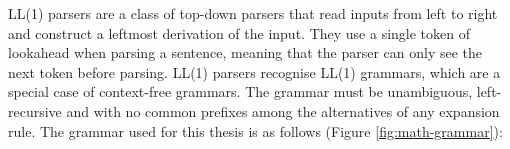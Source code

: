 LL(1) parsers are a class of top-down parsers that read inputs from left to right and construct a leftmost derivation of the input. They use a single token of lookahead when parsing a sentence, meaning that the parser can only see the next token before parsing. LL(1) parsers recognise LL(1) grammars, which are a special case of context-free grammars. The grammar must be unambiguous, left-recursive and with no common prefixes among the alternatives of any expansion rule. The grammar used for this thesis is as follows (Figure \ref{fig:math-grammar}):

\begin{figure}[ht]
  \begin{multicols}{2}
\end{multicols}
\end{figure}
